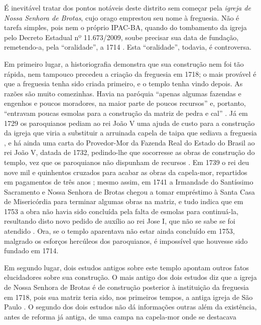 É inevitável tratar dos pontos notáveis deste distrito sem começar pela \textit{igreja de Nossa Senhora de Brotas}, cujo orago emprestou seu nome à freguesia. Não é tarefa simples, pois nem o próprio IPAC-BA, quando do tombamento da igreja pelo Decreto Estadual nº 11.673/2009, soube precisar sua data de fundação, remetendo-a, pela ``oralidade'', a 1714 \cite{ipac_brotas_2015}. Esta ``oralidade'', todavia, é controversa. 

Em primeiro lugar, a historiografia demonstra que sua construção nem foi tão rápida, nem tampouco precedeu a criação da freguesia em 1718; o mais provável é que a freguesia tenha sido criada primeiro, e o templo tenha vindo depois. As razões são muito comezinhas. Havia na paróquia ``apenas algumas fazendas e engenhos e poucos moradores, na maior parte de poucos recursos'' e, portanto, ``entravam poucas esmolas para a construção da matriz de pedra e cal'' \cite[p.~10]{ott_engenhos_1996}. Já em 1729 os paroquianos pediam ao rei João V uma ajuda de custo para a construção da igreja que viria a substituir a arruinada capela de taipa que sediava a freguesia \cite[p.~10]{ott_engenhos_1996}, e há ainda uma carta do Provedor-Mor da Fazenda Real do Estado do Brasil ao rei João V, datada de 1732, pedindo-lhe que socorresse as obras de construção do templo, vez que os paroquianos não dispunham de recursos \cite[p.~30]{vivas_botelho_2011}. Em 1739 o rei deu nove mil e quinhentos cruzados para acabar as obras da capela-mor, repartidos em pagamentos de três anos \cite[p.~10]{ott_engenhos_1996}; mesmo assim, em 1741 a Irmandade do Santíssimo Sacramento e Nossa Senhora de Brotas chegou a tomar empréstimo à Santa Casa de Misericórdia para terminar algumas obras na matriz, e tudo indica que em 1753 a obra não havia sido concluída pela falta de esmolas para continuá-la, resultando disto novo pedido de auxílio ao rei Jose I, que não se sabe se foi atendido \cite[p.~10]{ott_engenhos_1996}. Ora, se o templo aparentava não estar ainda concluído em 1753, malgrado os esforços hercúleos dos paroquianos, é impossível que houvesse sido fundado em 1714. 

Em segundo lugar, dois estudos antigos sobre este templo \cite{campos_brotas_1942,texbar_capellas_1930} apontam outros fatos elucidadores sobre sua construção. O mais antigo dos dois estudos diz que a igreja de Nossa Senhora de Brotas é de construção posterior à instituição da freguesia em 1718, pois sua matriz teria sido, nos primeiros tempos, a antiga igreja de São Paulo \cite[p.~344]{texbar_capellas_1930}. O segundo dos dois estudos não dá informações outras além da existência, antes de reforma já antiga, de uma campa na capela-mor onde se destacava 

